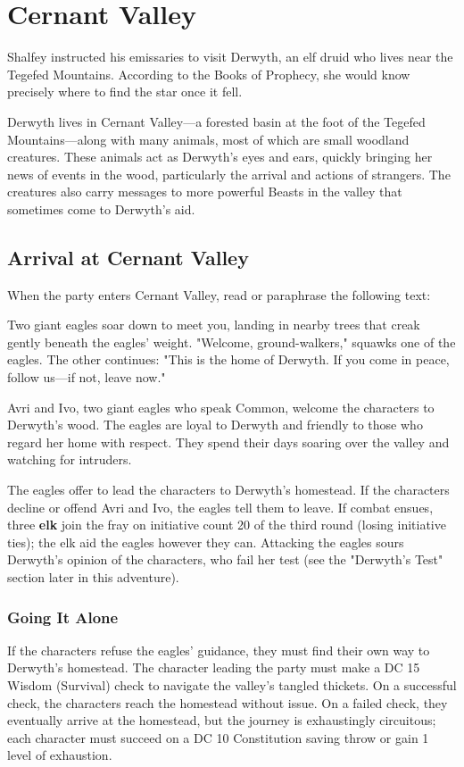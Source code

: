 \documentclass[10pt,a4paper,twoside,bg=print,twocolumn,openany,nodeprecatedcode]{dndbook}
\begin{document}
\section{Cernant Valley}
Shalfey instructed his emissaries to visit Derwyth, an elf druid who lives near the Tegefed Mountains. According to the Books of Prophecy, she would know precisely where to find the star once it fell.

Derwyth lives in Cernant Valley—a forested basin at the foot of the Tegefed Mountains—along with many animals, most of which are small woodland creatures. These animals act as Derwyth's eyes and ears, quickly bringing her news of events in the wood, particularly the arrival and actions of strangers. The creatures also carry messages to more powerful Beasts in the valley that sometimes come to Derwyth's aid.

\subsection{Arrival at Cernant Valley}
When the party enters Cernant Valley, read or paraphrase the following text:

\begin{DndReadAloud}{}
Two giant eagles soar down to meet you, landing in nearby trees that creak gently beneath the eagles' weight. "Welcome, ground-walkers," squawks one of the eagles. The other continues: "This is the home of Derwyth. If you come in peace, follow us—if not, leave now."

\end{DndReadAloud}

Avri and Ivo, two giant eagles who speak Common, welcome the characters to Derwyth's wood. The eagles are loyal to Derwyth and friendly to those who regard her home with respect. They spend their days soaring over the valley and watching for intruders.

The eagles offer to lead the characters to Derwyth's homestead. If the characters decline or offend Avri and Ivo, the eagles tell them to leave. If combat ensues, three \textbf{elk} join the fray on initiative count 20 of the third round (losing initiative ties); the elk aid the eagles however they can. Attacking the eagles sours Derwyth's opinion of the characters, who fail her test (see the "Derwyth's Test" section later in this adventure).

\subsubsection{Going It Alone}
If the characters refuse the eagles' guidance, they must find their own way to Derwyth's homestead. The character leading the party must make a DC 15 Wisdom (Survival) check to navigate the valley's tangled thickets. On a successful check, the characters reach the homestead without issue. On a failed check, they eventually arrive at the homestead, but the journey is exhaustingly circuitous; each character must succeed on a DC 10 Constitution saving throw or gain 1 level of exhaustion.
\end{document}

